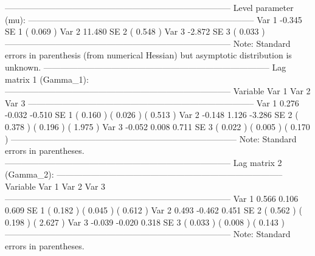 \documentclass[article]{jss}
\begin{document}
\begin{CodeChunk}
\begin{CodeOutput}
--------------------------------------------------------------------------------
    Level parameter (mu):                                                                         
--------------------------------------------------------------------------------
        Var 1            -0.345     
         SE 1         (   0.069  )  
        Var 2            11.480     
         SE 2         (   0.548  )  
        Var 3            -2.872     
         SE 3         (   0.033  )  
--------------------------------------------------------------------------------
Note: Standard errors in parenthesis (from numerical Hessian) 
      but asymptotic distribution is unknown. 
--------------------------------------------------------------------------------
    Lag matrix 1 (Gamma_1):                                                                            
--------------------------------------------------------------------------------
      Variable         Var 1          Var 2          Var 3   
--------------------------------------------------------------------------------
      Var 1            0.276         -0.032         -0.510    
       SE 1        (   0.160  )   (   0.026  )   (   0.513  )  
      Var 2           -0.148          1.126         -3.286    
       SE 2        (   0.378  )   (   0.196  )   (   1.975  )  
      Var 3           -0.052          0.008          0.711    
       SE 3        (   0.022  )   (   0.005  )   (   0.170  )  
--------------------------------------------------------------------------------
Note: Standard errors in parentheses.                                                                
--------------------------------------------------------------------------------
    Lag matrix 2 (Gamma_2):                                                                            
--------------------------------------------------------------------------------
      Variable         Var 1          Var 2          Var 3   
--------------------------------------------------------------------------------
      Var 1            0.566          0.106          0.609    
       SE 1        (   0.182  )   (   0.045  )   (   0.612  )  
      Var 2            0.493         -0.462          0.451    
       SE 2        (   0.562  )   (   0.198  )   (   2.627  )  
      Var 3           -0.039         -0.020          0.318    
       SE 3        (   0.033  )   (   0.008  )   (   0.143  )  
--------------------------------------------------------------------------------
Note: Standard errors in parentheses.                                                                

\end{CodeOutput}
\end{CodeChunk}
\end{document}
